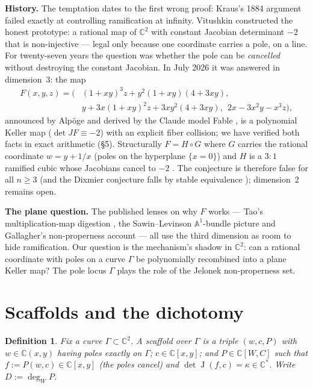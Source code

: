 \documentclass[11pt]{article}
\newtheorem{definition}[theorem]{Definition}
\newcommand{\C}{\mathbb{C}}
\newcommand{\J}{\operatorname{J}}
\begin{document}
\textbf{History.} The temptation dates to the first wrong proof: Kraus's 1884
argument \cite{Kraus1884,RD2025} failed exactly at controlling ramification at
infinity. Vitushkin \cite{Vitushkin1999} constructed the honest prototype: a
rational map of $\C^2$ with constant Jacobian determinant $-2$ that is
non-injective --- legal only because one coordinate carries a pole, on a line.
For twenty-seven years the question was whether the pole can be
\emph{cancelled} without destroying the constant Jacobian. In July 2026 it was
answered in dimension~3: the map
\begin{align*}
F(x,y,z) = \bigl(&(1+xy)^3 z + y^2(1+xy)(4+3xy),\\
&y + 3x(1+xy)^2 z + 3xy^2(4+3xy),\ \ 2x - 3x^2y - x^3z\bigr),
\end{align*}
announced by Alp\"oge and derived by the Claude model Fable \cite{Alpoge2026},
is a polynomial Keller map ($\det JF \equiv -2$) with an explicit fiber
collision; we have verified both facts in exact arithmetic (\S5).
Structurally $F = H \circ G$ where $G$ carries the rational coordinate
$w = y + 1/x$ (poles on the hyperplane $\{x = 0\}$) and $H$ is a $3\!:\!1$
ramified cubic whose Jacobians cancel to $-2$
\cite{SBS2026,Tao2026,Gallagher2026}. The conjecture is therefore false for
all $n \ge 3$ (and the Dixmier conjecture falls by stable equivalence
\cite{Zhang2026}); dimension~2 remains open.

\textbf{The plane question.} The published lenses on why $F$ works --- Tao's
multiplication-map digestion \cite{Tao2026}, the Sawin--Levinson
$\mathbb{A}^1$-bundle picture and Gallagher's non-properness account
\cite{Gallagher2026} --- all use the third dimension as room to hide
ramification. Our question is the mechanism's shadow in $\C^2$: can a
rational coordinate with poles on a curve $\Gamma$ be polynomially recombined
into a plane Keller map? The pole locus $\Gamma$ plays the role of the
Jelonek non-properness set.

\section{Scaffolds and the dichotomy}

\begin{definition}
Fix a curve $\Gamma \subset \C^2$. A \emph{scaffold over $\Gamma$} is a
triple $(w, c, P)$ with $w \in \C(x,y)$ having poles exactly on $\Gamma$;
$c \in \C[x,y]$; and $P \in \C[W, C]$ such that $f := P(w, c) \in \C[x,y]$
(the poles cancel) and $\det \J(f, c) = \kappa \in \C^{*}$. Write
$D := \deg_W P$.
\end{definition}
\end{document}
